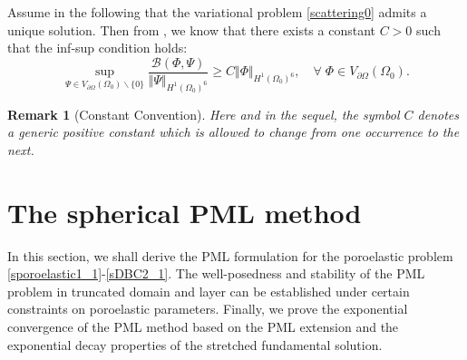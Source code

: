 \documentclass[11pt]{article}
\newcommand{\ba}{\backslash}
\newcommand{\pa}{\partial}
\newcommand{\Om}{\Omega}
\newtheorem{remark}[theorem]{Remark}
\begin{document}
Assume in the following that the variational problem \eqref{scattering0} admits a unique solution. 
Then from \cite[Theorem 3.2]{Bramble2007}, we know that there exists a constant $C>0$ such that 
the inf-sup condition holds:
\begin{equation}\label{infsup_B1}
\sup_{\Psi\in { V_{\pa \Om}(\Om_0)}\ba\{0\}} \frac{\mathcal{B}(\Phi,\Psi)}
{\Vert \Psi\Vert_{H^{1}(\Om_0)^6}}\geq C\Vert \Phi\Vert_{H^{1}(\Om_0)^6},\quad \forall\;\Phi\in  V_{\pa \Om}(\Om_0).
\end{equation}
\begin{remark}[Constant Convention]
{\rm Here and in the sequel, the symbol $C$ denotes a generic positive constant which is allowed to 
change from one occurrence to the next.}
\end{remark}

\section{The spherical PML method}\label{sec:PML}
In this section, we shall derive the PML formulation for the poroelastic problem 
\eqref{sporoelastic1_1}-\eqref{sDBC2_1}. The well-posedness and stability of the PML problem 
in truncated domain and layer can be established under certain constraints on poroelastic parameters. 
Finally, we prove the exponential convergence of the PML method based on the PML extension 
and the exponential decay properties of the stretched fundamental solution.
\end{document}
